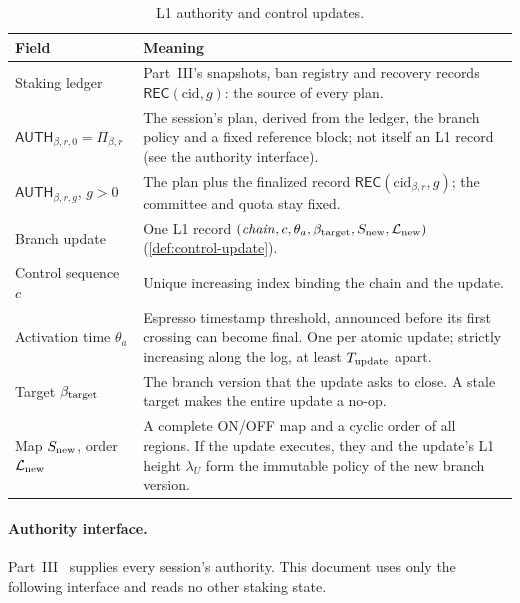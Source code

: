\documentclass[11pt,a4paper]{article}
\newcommand{\tagg}[1]{\ensuremath{\mathsf{#1}}}
\begin{document}
\begin{table}[htbp]\centering\small
\caption{L1 authority and control updates.}\label{tab:l1}
\begin{tabularx}{\linewidth}{@{}p{.27\linewidth}Y@{}}\toprule
Field & Meaning\\\midrule
Staking ledger & Part~III's snapshots, ban registry and recovery records
$\tagg{REC}(\mathrm{cid},g)$: the source of every plan.\\
$\tagg{AUTH}_{\beta,r,0}=\Pi_{\beta,r}$ & The session's plan, derived from
the ledger, the branch policy and a fixed reference block; not itself an
L1 record (see the authority interface).\\
$\tagg{AUTH}_{\beta,r,g}$, $g>0$ & The plan plus the finalized record
$\tagg{REC}(\mathrm{cid}_{\beta,r},g)$; the committee and quota stay fixed.\\
Branch update & One L1 record
$(\mathit{chain},c,\theta_a,\beta_{\rm target},S_{\rm new},\mathcal L_{\rm new})$
(\cref{def:control-update}).\\
Control sequence $c$ & Unique increasing index binding the chain and the
update.\\
Activation time $\theta_a$ & Espresso timestamp threshold, announced
before its first crossing can become final. One per atomic update;
strictly increasing along the log, at least
$T_{\rm update}$ apart.\\
Target $\beta_{\rm target}$ & The branch version that the update asks to
close. A stale target makes the entire update a no-op.\\
Map $S_{\rm new}$, order $\mathcal L_{\rm new}$ & A complete ON/OFF map
and a cyclic order of all regions. If the update executes, they and the
update's L1 height $\lambda_U$ form the immutable policy of the new
branch version.\\\bottomrule
\end{tabularx}
\end{table}

\paragraph{Authority interface.}
\label{sec:authority-context}
Part~III~\cite{part3} supplies every session's authority. This document
uses only the following interface and reads no other staking state.
\end{document}
